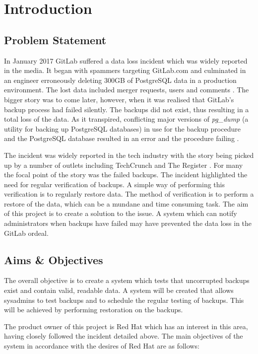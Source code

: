 \section{Introduction}

\subsection{Problem Statement}
In January 2017 GitLab suffered a data loss incident which was widely reported in the media. It began with spammers targeting GitLab.com and culminated in an engineer erroneously deleting 300GB of PostgreSQL data in a production environment. The lost data included merger requests, users and comments \citep{gitlab1}. The bigger story was to come later, however, when it was realised that GitLab's backup process had failed silently. The backups did not exist, thus resulting in a total loss of the data. As it transpired, conflicting major versions of \textit{pg\_dump} (a utility for backing up PostgreSQL databases) in use for the backup procedure and the PostgreSQL database resulted in an error and the procedure failing \citep{gitlab2}.

The incident was widely reported in the tech industry with the story being picked up by a number of outlets including TechCrunch \citeyearpar{lomas} and The Register \citeyearpar{sharwood}. For many the focal point of the story was the failed backups. The incident highlighted the need for regular verification of backups. A simple way of performing this verification is to regularly restore data. The method of verification is to perform a restore of the data, which can be a mundane and time consuming task. The aim of this project is to create a solution to the issue. A system which can notify administrators when backups have failed may have prevented the data loss in the GitLab ordeal.

\subsection{Aims \& Objectives}
The overall objective is to create a system which tests that uncorrupted backups exist and contain valid, readable data. A system will be created that allows sysadmins to test backups and to schedule the regular testing of backups. This will be achieved by performing restoration on the backups.

The product owner of this project is Red Hat which has an interest in this area, having closely followed the incident detailed above. The main objectives of the system in accordance with the desires of Red Hat are as follows:

